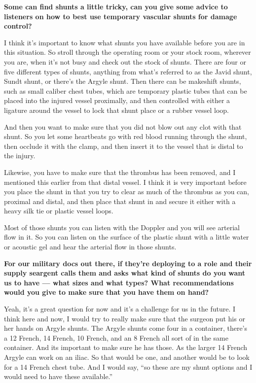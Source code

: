 \documentclass[
]{book}
\begin{document}
\textbf{Some can find shunts a little tricky, can you give some advice to
listeners on how to best use temporary vascular shunts for damage
control?}

I think it's important to know what shunts you have available before you
are in this situation. So stroll through the operating room or your
stock room, wherever you are, when it's not busy and check out the stock
of shunts. There are four or five different types of shunts, anything
from what's referred to as the Javid shunt, Sundt shunt, or there's the
Argyle shunt. Then there can be makeshift shunts, such as small caliber
chest tubes, which are temporary plastic tubes that can be placed into
the injured vessel proximally, and then controlled with either a
ligature around the vessel to lock that shunt place or a rubber vessel
loop.

And then you want to make sure that you did not blow out any clot with
that shunt. So you let some heartbeats go with red blood running through
the shunt, then occlude it with the clamp, and then insert it to the
vessel that is distal to the injury.

Likewise, you have to make sure that the thrombus has been removed, and
I mentioned this earlier from that distal vessel. I think it is very
important before you place the shunt in that you try to clear as much of
the thrombus as you can, proximal and distal, and then place that shunt
in and secure it either with a heavy silk tie or plastic vessel loops.

Most of those shunts you can listen with the Doppler and you will see
arterial flow in it. So you can listen on the surface of the plastic
shunt with a little water or acoustic gel and hear the arterial flow in
those shunts.

\textbf{For our military docs out there, if they're deploying to a role and
their supply seargent calls them and asks what kind of shunts do you
want us to have --- what sizes and what types? What recommendations
would you give to make sure that you have them on hand?}

Yeah, it's a great question for now and it's a challenge for us in the
future. I think here and now, I would try to really make sure that the
surgeon put his or her hands on Argyle shunts. The Argyle shunts come
four in a container, there's a 12 French, 14 French, 10 French, and an 8
French all sort of in the same container. And its important to make sure
he has those. As the larger 14 French Argyle can work on an iliac. So
that would be one, and another would be to look for a 14 French chest
tube. And I would say, ``so these are my shunt options and I would need
to have these available.''
\end{document}
